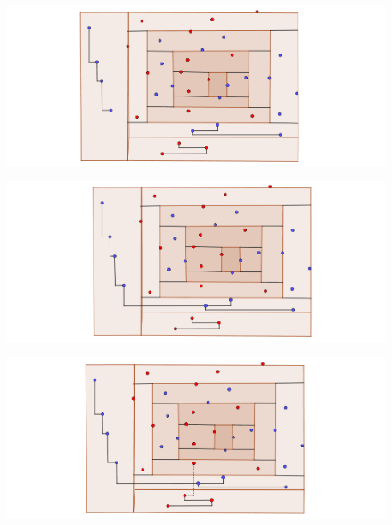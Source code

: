 \documentclass{beamer}
\begin{document}
\begin{frame}
\begin{figure}[h]
\includegraphics[width=\textwidth]{Construccion-poligono-2-alternancia-deco-2}
\end{figure}
\end{frame}
\begin{frame}
\begin{figure}[h]
\includegraphics[width=\textwidth]{Construccion-poligono-2-alternancia-deco-3}
\end{figure}
\end{frame}
\begin{frame}
\begin{figure}[h]
\includegraphics[width=\textwidth]{Construccion-poligono-2-alternancia-deco-4}
\end{figure}
\end{frame}
\end{document}
